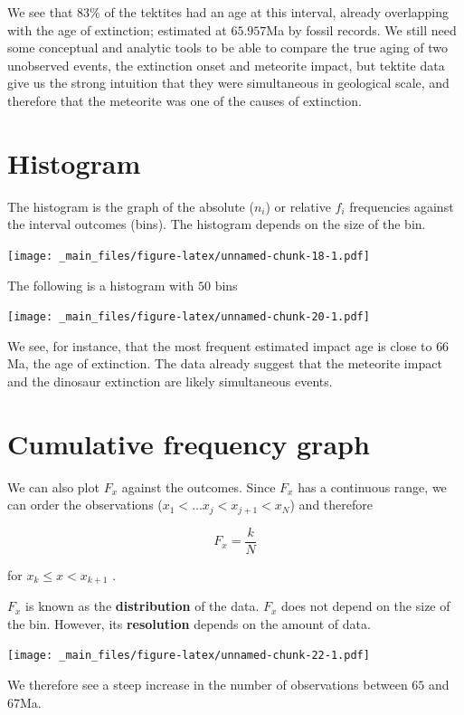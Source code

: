 \documentclass[
]{book}
\begin{document}
We see that \(83\%\) of the tektites had an age at this interval, already overlapping with the age of extinction; estimated at \(65.957\)Ma by fossil records. We still need some conceptual and analytic tools to be able to compare the true aging of two unobserved events, the extinction onset and meteorite impact, but tektite data give us the strong intuition that they were simultaneous in geological scale, and therefore that the meteorite was one of the causes of extinction.

\hypertarget{histogram}{%
\section{Histogram}\label{histogram}}

The histogram is the graph of the absolute (\(n_i\)) or relative \(f_i\) frequencies against the interval outcomes (bins). The histogram depends on the size of the bin.

\texttt{[image: \_main\_files/figure-latex/unnamed-chunk-18-1.pdf]}

The following is a histogram with \(50\) bins

\texttt{[image: \_main\_files/figure-latex/unnamed-chunk-20-1.pdf]}

We see, for instance, that the most frequent estimated impact age is close to \(66\)Ma, the age of extinction. The data already suggest that the meteorite impact and the dinosaur extinction are likely simultaneous events.

\hypertarget{cumulative-frequency-graph-1}{%
\section{Cumulative frequency graph}\label{cumulative-frequency-graph-1}}

We can also plot \(F_x\) against the outcomes. Since \(F_x\) has a continuous range, we can order the observations (\(x_1 <... x_j < x_{j+1} < x_N\)) and therefore

\[F_x = \frac{k}{N}\]

for \(x_{k} \leq x < x_{k+ 1}\) .

\(F_x\) is known as the \textbf{distribution} of the data. \(F_x\) does not depend on the size of the bin. However, its \textbf{resolution} depends on the amount of data.

\texttt{[image: \_main\_files/figure-latex/unnamed-chunk-22-1.pdf]}

We therefore see a steep increase in the number of observations between \(65\) and \(67\)Ma.
\end{document}
